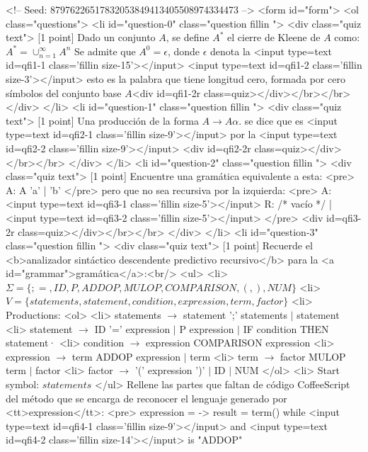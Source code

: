 \begin{rawhtml}
{      <!-- Seed: 87976226517832053849413405508974334473 -->
<form id="form">
  <ol class="questions">
    <li id="question-0" class="question fillin ">
      <div class="quiz text">
[1 point] 
Dado un conjunto $A$, se define $A^*$ el cierre de Kleene de $A$ como:
\( A^* = \cup_{n=1}^{\infty} A^n \)
Se admite que $A^0 = { \epsilon }$, donde $\epsilon$ denota la
<input type=text id=qfi1-1 class='fillin size-15'></input> <input type=text id=qfi1-2 class='fillin size-3'></input> esto es
la palabra que tiene longitud cero, formada por cero símbolos del conjunto base $A$<div id=qfi1-2r class=quiz></div></br></br>      </div>
    </li>
    <li id="question-1" class="question fillin ">
      <div class="quiz text">
[1 point] 
Una producción de la forma $A \rightarrow A \alpha$.
se dice que es <input type=text id=qfi2-1 class='fillin size-9'></input> por la <input type=text id=qfi2-2 class='fillin size-9'></input>
<div id=qfi2-2r class=quiz></div></br></br>      </div>
    </li>
    <li id="question-2" class="question fillin ">
      <div class="quiz text">
[1 point] Encuentre una gramática equivalente a esta:
      <pre>
        A: A 'a' | 'b'
      </pre>
      pero que no sea recursiva por la izquierda:
      <pre>
        A: <input type=text id=qfi3-1 class='fillin size-5'></input>
        R: /* vacío */ | <input type=text id=qfi3-2 class='fillin size-5'></input>
      </pre>
    <div id=qfi3-2r class=quiz></div></br></br>      </div>
    </li>
    <li id="question-3" class="question fillin ">
      <div class="quiz text">
[1 point] 
Recuerde el <b>analizador sintáctico descendente predictivo recursivo</b> 
para la <a id="grammar">gramática</a>:<br/>
<ul>
  <li> $\Sigma = \{ ; =, ID, P, ADDOP, MULOP, COMPARISON, (, ), NUM \}$
  <li> $V = \{ statements, statement, condition, expression, term, factor \}$
  <li> Productions:
  <ol>
    <li>
    statements  $ \rightarrow$ statement ';' statements  $\vert$ statement
    <li>
    statement  $ \rightarrow$ ID '=' expression  $\vert$ P expression
 $ \vert$ IF condition THEN statement·
    <li> condition $ \rightarrow$ expression COMPARISON expression
    <li>
    expression  $ \rightarrow$ term ADDOP expression  $\vert$ term
    <li>
    term  $ \rightarrow$ factor MULOP term  $\vert$ factor
    <li>
    factor  $ \rightarrow$ '(' expression ')' $\vert$ ID $ \vert$ NUM
  </ol>
  <li> Start symbol: $statements$
</ul>
Rellene las partes que faltan de código CoffeeScript del 
método que se encarga de reconocer el lenguaje generado
por <tt>expression</tt>:
<pre>
  expression = ->
    result = term()
    while <input type=text id=qfi4-1 class='fillin size-9'></input> and <input type=text id=qfi4-2 class='fillin size-14'></input> is "ADDOP"
}
\end{rawhtml}
